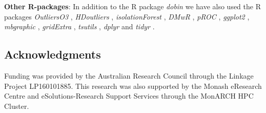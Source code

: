 \documentclass[letter,12pt]{article}
\begin{document}
\textbf{Other R-packages}: In addition to the R package \textit{dobin} we have also used the R packages \textit{OutliersO3} \citep{O3Rpack}, {\color{blue} \textit{HDoutliers} \citep{hdoutliers}}, \textit{isolationForest} \citep{isolationForest}, \textit{DMwR} \citep{DMwR}, \textit{pROC} \citep{pROC}, \textit{ggplot2} \citep{ggplot2}, \textit{mbgraphic} \citep{mbgraphic}, \textit{gridExtra} \citep{gridextra}, \textit{tsutils} \citep{tsutils}, \textit{dplyr} \citep{dplyr} and \textit{tidyr} \citep{tidyr}.%


\subsection*{Acknowledgments}

Funding was provided by the Australian Research Council through the Linkage Project LP160101885. This research was also supported by the Monash eResearch Centre and eSolutions-Research Support Services through the MonARCH HPC Cluster.


\end{document}
